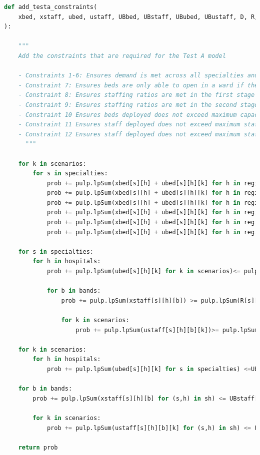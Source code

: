 \documentclass[../thesis.tex]{subfiles}
\begin{document}
\begin{lstlisting}[language=python]
def add_testa_constraints(
    xbed, xstaff, ubed, ustaff, UBbed, UBstaff, UBubed, UBustaff, D, R, K, prob, sh, shb, shk, srhk, sbhk
):
    
    """
    Add the constraints that are required for the Test A model
    
    - Constraints 1-6: Ensures demand is met across all specialties and all regions
    - Constraint 7: Ensures beds are only able to open in a ward if the facilities are able to be opened - 2nd stage
    - Constraint 8: Ensures staffing ratios are met in the first stage
    - Constraint 9: Ensures staffing ratios are met in the second stage
    - Constraint 10 Ensures beds deployed does not exceed maximum capacity of hospital - 2nd stage
    - Constraint 11 Ensures staff deployed does not exceed maximum staffing resources - 1st stage
    - Constraint 12 Ensures staff deployed does not exceed maximum staffing resources - 2nd stage
      """
        
    for k in scenarios:
        for s in specialties:
            prob += pulp.lpSum(xbed[s][h] + ubed[s][h][k] for h in region1) >= pulp.lpSum(D[s][0][k]) #Constraint 1
            prob += pulp.lpSum(xbed[s][h] + ubed[s][h][k] for h in region2) >= pulp.lpSum(D[s][1][k]) #Constraint 2
            prob += pulp.lpSum(xbed[s][h] + ubed[s][h][k] for h in region3) >= pulp.lpSum(D[s][2][k]) #Constraint 3
            prob += pulp.lpSum(xbed[s][h] + ubed[s][h][k] for h in region4) >= pulp.lpSum(D[s][3][k]) #Constraint 4
            prob += pulp.lpSum(xbed[s][h] + ubed[s][h][k] for h in region5) >= pulp.lpSum(D[s][4][k]) #Constraint 5
            prob += pulp.lpSum(xbed[s][h] + ubed[s][h][k] for h in region6) >= pulp.lpSum(D[s][5][k]) #Constraint 6 
            
    for s in specialties: 
        for h in hospitals:
            prob += pulp.lpSum(ubed[s][h][k] for k in scenarios)<= pulp.lpSum(K[s][h]) #Constraint 7
            
            for b in bands:
                prob += pulp.lpSum(xstaff[s][h][b]) >= pulp.lpSum(R[s][b]*(xbed[s][h])) #Constraint 8
                
                for k in scenarios:
                    prob += pulp.lpSum(ustaff[s][h][b][k])>= pulp.lpSum(R[s][b]*(ubed[s][h][k])) #Constraint 9   
        
    for k in scenarios: 
        for h in hospitals:
            prob += pulp.lpSum(ubed[s][h][k] for s in specialties) <=UBubed[h][k] #Constraint 10
        
    for b in bands:
        prob += pulp.lpSum(xstaff[s][h][b] for (s,h) in sh) <= UBstaff[b] #Constraint 11
        
        for k in scenarios:
            prob += pulp.lpSum(ustaff[s][h][b][k] for (s,h) in sh) <= UBustaff[b][k] #Constraint 12
            
    return prob
\end{lstlisting}
\end{document}

